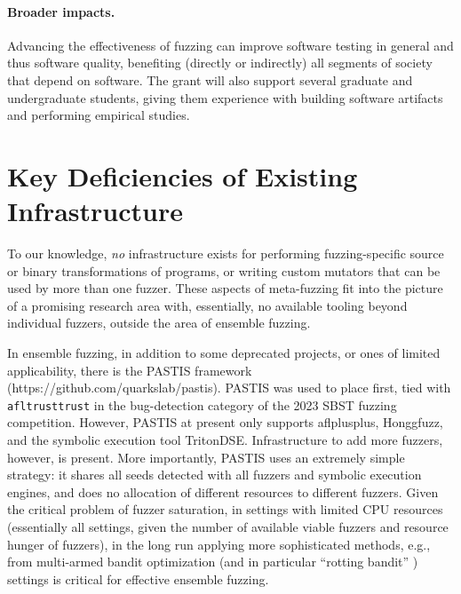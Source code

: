 \documentclass[numbers]{proposalnsf}
\begin{document}
\paragraph{Broader impacts.} Advancing the effectiveness of fuzzing can improve software testing in general and
thus software quality, benefiting (directly or indirectly) all
segments of society that depend on software.  The grant
will also support several graduate and undergraduate students, giving them experience with
building software artifacts and performing empirical studies.


\section{Key Deficiencies of Existing Infrastructure}

To our knowledge, \emph{no} infrastructure exists for performing fuzzing-specific source or binary transformations of programs, or writing custom mutators that can be used by more than one fuzzer.  These aspects of meta-fuzzing fit into the picture of a promising research area with, essentially, no available tooling beyond individual fuzzers, outside the area of ensemble fuzzing.

In ensemble fuzzing, in addition to some deprecated projects, or ones of limited applicability, there is the PASTIS framework (https://github.com/quarkslab/pastis).  PASTIS was used to place first, tied with {\tt afltrusttrust} in the bug-detection category of the 2023 SBST fuzzing competition.  However, PASTIS at present only supports aflplusplus, Honggfuzz, and the symbolic execution tool TritonDSE.  Infrastructure to add more fuzzers, however, is present.  More importantly, PASTIS uses an extremely simple strategy:  it shares all seeds detected with all fuzzers and symbolic execution engines, and does no allocation of different resources to different fuzzers.  Given the critical problem of fuzzer saturation, in settings with limited CPU resources (essentially all settings, given the number of available viable fuzzers and resource hunger of fuzzers), in the long run applying more sophisticated methods, e.g., from multi-armed bandit optimization (and in particular ``rotting bandit'' \cite{}) settings is critical for effective ensemble fuzzing.
\end{document}

